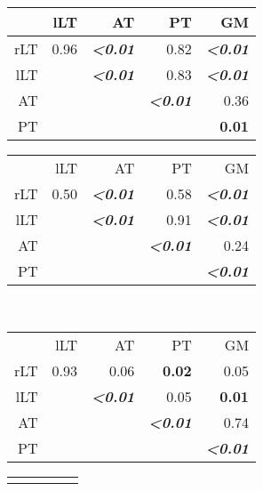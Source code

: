 \begin{table}
{\begin{minipage}{\linewidth}
\begin{tabular}{rrrrr}
			\toprule	
	              & lLT   & AT    & PT    & GM \\
		    \midrule
	        rLT   & 0.96  & \textbf{\emph{<0.01}}  & 0.82  & \textbf{\emph{<0.01}} \\
	        lLT   &       & \textbf{\emph{<0.01}}  & 0.83  & \textbf{\emph{<0.01}} \\
	        AT    &       &       & \textbf{\emph{<0.01}}  & 0.36 \\
	        PT    &       &       &       & \textbf{0.01} \\
	        \bottomrule
	        \end{tabular}%
			\hspace{0.5cm}
	        \begin{tabular}{rrrrr}
		        \addlinespace
				\multicolumn{5}{c}{\textbf{FWHM$_{xy}$}}\\
		        \toprule
		              & lLT   & AT    & PT    & GM \\
		        \midrule
		        rLT   & 0.50  & \textbf{\emph{<0.01}}  & 0.58  & \textbf{\emph{<0.01}} \\
		        lLT   &       & \textbf{\emph{<0.01}}  & 0.91  & \textbf{\emph{<0.01}} \\
		        AT    &       &       & \textbf{\emph{<0.01}}  & 0.24 \\
		        PT    &       &       &       & \textbf{\emph{<0.01}} \\
		        \bottomrule
		        \end{tabular}%
				\\[0.5ex]
		        \begin{tabular}{rrrrr}
		        \addlinespace
				\multicolumn{5}{c}{\textbf{P0$_{z}$}}\\
				\toprule
		              & lLT   & AT    & PT    & GM \\
		        \midrule
		        rLT   & 0.93  & 0.06  & \textbf{0.02}  & 0.05 \\
		        lLT   &       & \textbf{\emph{<0.01}}  & 0.05  & \textbf{0.01} \\
		        AT    &       &       & \textbf{\emph{<0.01}}  & 0.74 \\
		        PT    &       &       &       & \textbf{\emph{<0.01}} \\
		        \bottomrule
		        \end{tabular}%
                \hspace{0.5cm}
		        \begin{tabular}{rrrrr}
		        \addlinespace

\end{tabular}
\end{minipage}}
\end{table}
